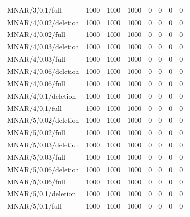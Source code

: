 \begin{longtable}{p{1.5in}p{.6in}p{.6in}p{.5in}p{.5in}p{.5in}p{.6in}p{.7in}}
MNAR/3/0.1/full & 1000 & 1000 & 1000 & 0 & 0 & 0 & 0\\
MNAR/4/0.02/deletion & 1000 & 1000 & 1000 & 0 & 0 & 0 & 0\\
MNAR/4/0.02/full & 1000 & 1000 & 1000 & 0 & 0 & 0 & 0\\
MNAR/4/0.03/deletion & 1000 & 1000 & 1000 & 0 & 0 & 0 & 0\\
MNAR/4/0.03/full & 1000 & 1000 & 1000 & 0 & 0 & 0 & 0\\
MNAR/4/0.06/deletion & 1000 & 1000 & 1000 & 0 & 0 & 0 & 0\\
MNAR/4/0.06/full & 1000 & 1000 & 1000 & 0 & 0 & 0 & 0\\
MNAR/4/0.1/deletion & 1000 & 1000 & 1000 & 0 & 0 & 0 & 0\\
MNAR/4/0.1/full & 1000 & 1000 & 1000 & 0 & 0 & 0 & 0\\
MNAR/5/0.02/deletion & 1000 & 1000 & 1000 & 0 & 0 & 0 & 0\\
MNAR/5/0.02/full & 1000 & 1000 & 1000 & 0 & 0 & 0 & 0\\
MNAR/5/0.03/deletion & 1000 & 1000 & 1000 & 0 & 0 & 0 & 0\\
MNAR/5/0.03/full & 1000 & 1000 & 1000 & 0 & 0 & 0 & 0\\
MNAR/5/0.06/deletion & 1000 & 1000 & 1000 & 0 & 0 & 0 & 0\\
MNAR/5/0.06/full & 1000 & 1000 & 1000 & 0 & 0 & 0 & 0\\
MNAR/5/0.1/deletion & 1000 & 1000 & 1000 & 0 & 0 & 0 & 0\\
MNAR/5/0.1/full & 1000 & 1000 & 1000 & 0 & 0 & 0 & 0\\
\bottomrule\end{longtable}
